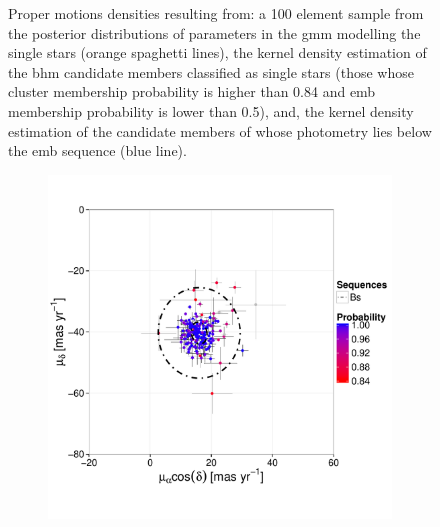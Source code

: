 \begin{figure}[ht!]
\begin{subfigure}[t]{0.45\textwidth}
        \caption{}
    \end{subfigure}
\caption{Proper motions densities resulting from: a 100 element sample from the posterior distributions of parameters in the \gls{gmm} modelling the single stars (orange spaghetti lines), the kernel density estimation of the \gls{bhm} candidate members classified as single stars (those whose cluster membership probability is higher than 0.84 and \gls{emb} membership probability is lower than 0.5), and, the kernel density estimation of the candidate members of \citet{Bouy2015} whose photometry lies below the \gls{emb} sequence (blue line).}
\label{fig:PMCs}
\end{figure}

\begin{figure}[ht!]
    \centering
    \begin{subfigure}[t]{0.45\textwidth}
    \centering
       \includegraphics[page=2,width=\textwidth]{background/Figures/BHM/Bs_members.pdf}
        \caption{}
    \end{subfigure}
    \begin{subfigure}[t]{0.45\textwidth}
    \centering

\end{subfigure}
\end{figure}
